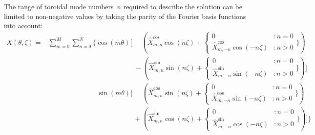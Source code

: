 The range of toroidal mode numbers~$n$ required to describe the solution
can be limited to non-negative values by taking the parity of the Fourier basis functions into account:
\begin{align}
  X(\theta, \zeta)
  =& \sum_{m=0}^M \sum_{n=0}^N \Biggl\{
     \cos(m \theta) \Biggl[ \phantom{-}\,
                            \left(   \hat{X}_{m,n}^\mathrm{cos} \cos(n \zeta)
                                  + \begin{cases}
                                     0                                          &: n = 0 \\
                                     \hat{X}_{m,-n}^\mathrm{cos} \cos(-n \zeta) &: n > 0
                                   \end{cases} \Biggr\} \right) \nonumber \\
  ~& \phantom{\sum_{m=0}^M \sum_{n=0}^N \Biggl\{}\,
     \phantom{\cos(m \theta) \Biggl[}\,
                           -\left(    \hat{X}_{m,n}^\mathrm{sin} \sin(n \zeta)
                                  + \begin{cases}
                                      0                                          & : n = 0 \\
                                      \hat{X}_{m,-n}^\mathrm{sin} \sin(-n \zeta) & : n > 0
                                    \end{cases} \Biggr\} \right) \Biggr] \nonumber \\
  ~& \phantom{\sum_{m=0}^M \sum_{n=0}^N \Biggl\{}\,
     \sin(m \theta) \Biggl[ \phantom{+}\,
                            \left(   \hat{X}_{m,n}^\mathrm{cos} \sin(n \zeta)
                                  + \begin{cases}
                                     0                                          & : n = 0 \\
                                     \hat{X}_{m,-n}^\mathrm{cos} \sin(-n \zeta) & : n > 0
                                   \end{cases} \Biggr\} \right) \nonumber \\
  ~& \phantom{\sum_{m=0}^M \sum_{n=0}^N \Biggl\{}\,
     \phantom{\sin(m \theta) \Biggl[}\,
                           +\left(    \hat{X}_{m,n}^\mathrm{sin} \cos(n \zeta)
                                  + \begin{cases}
                                      0                                          & : n = 0 \\
                                      \hat{X}_{m,-n}^\mathrm{sin} \cos(-n \zeta) & : n > 0
                                    \end{cases} \Biggr\} \right) \Biggr] \Biggr\}
\end{align}
